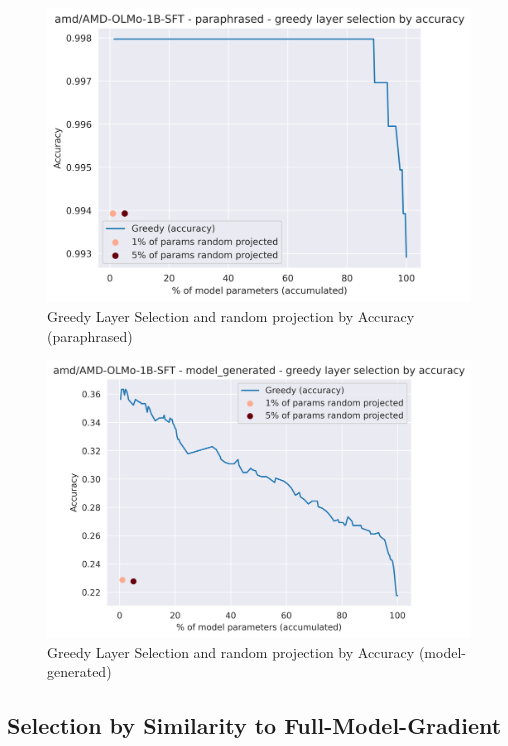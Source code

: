 \begin{figure}[ht]
    \centering
    \includegraphics[width=1\textwidth]{figures/results/paraphrased/greedy_layer_selection_accuracy.png}
    \caption{Greedy Layer Selection and random projection by Accuracy (paraphrased)}
    \label{fig:greedy_layer_selection_accuracy_paraphrased}
\end{figure}

\begin{figure}[ht]
    \centering
    \includegraphics[width=1\textwidth]{figures/results/model-generated/greedy_layer_selection_accuracy.png}
    \caption{Greedy Layer Selection and random projection by Accuracy (model-generated)}
    \label{fig:greedy_layer_selection_accuracy_model_generated}
\end{figure}

\subsection{Selection by Similarity to Full-Model-Gradient}

